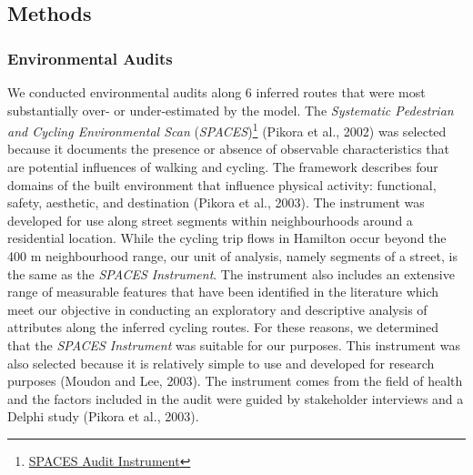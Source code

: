 \documentclass[]{elsarticle} %
\begin{document}
\hypertarget{methods}{%
\subsection{Methods}\label{methods}}

\hypertarget{environmental-audits}{%
\subsubsection{Environmental Audits}\label{environmental-audits}}

We conducted environmental audits along 6 inferred routes that were most
substantially over- or under-estimated by the model. The
\emph{Systematic Pedestrian and Cycling Environmental Scan}
(\emph{SPACES})\footnote{\href{https://activelivingresearch.org/sites/activelivingresearch.org/files/SPACES_Audit_Instrument_0.pdf}{SPACES
  Audit Instrument}} (Pikora et al., 2002) was selected because it
documents the presence or absence of observable characteristics that are
potential influences of walking and cycling. The framework describes
four domains of the built environment that influence physical activity:
functional, safety, aesthetic, and destination (Pikora et al., 2003).
The instrument was developed for use along street segments within
neighbourhoods around a residential location. While the cycling trip
flows in Hamilton occur beyond the 400 m neighbourhood range, our unit
of analysis, namely segments of a street, is the same as the
\emph{SPACES Instrument}. The instrument also includes an extensive
range of measurable features that have been identified in the literature
which meet our objective in conducting an exploratory and descriptive
analysis of attributes along the inferred cycling routes. For these
reasons, we determined that the \emph{SPACES Instrument} was suitable
for our purposes. This instrument was also selected because it is
relatively simple to use and developed for research purposes (Moudon and
Lee, 2003). The instrument comes from the field of health and the
factors included in the audit were guided by stakeholder interviews and
a Delphi study (Pikora et al., 2003).
\end{document}
